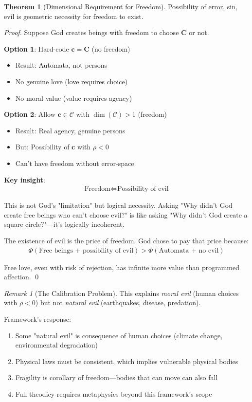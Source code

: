 \documentclass[11pt,a4paper]{article}
\theoremstyle{definition}
\newtheorem{theorem}{Theorem}[section]
\theoremstyle{remark}
\newtheorem{remark}{Remark}[section]
\newcommand{\CC}{\mathcal{C}}
\newcommand{\cc}{\mathbf{c}}
\begin{document}
\begin{enumerate}
\begin{theorem}[Dimensional Requirement for Freedom]
Possibility of error, sin, evil is geometric necessity for freedom to exist.
\end{theorem}

\begin{proof}
Suppose God creates beings with freedom to choose \(\mathbf{C}\) or not.

\textbf{Option 1}: Hard-code \(\cc = \mathbf{C}\) (no freedom)
\begin{itemize}
    \item Result: Automata, not persons
    \item No genuine love (love requires choice)
    \item No moral value (value requires agency)
\end{itemize}

\textbf{Option 2}: Allow \(\cc \in \CC\) with \(\dim(\CC) > 1\) (freedom)
\begin{itemize}
    \item Result: Real agency, genuine persons
    \item But: Possibility of \(\cc\) with \(\rho < 0\)
    \item Can't have freedom without error-space
\end{itemize}

\textbf{Key insight}: 
\begin{align}
\text{Freedom} \iff \text{Possibility of evil}
\end{align}

This is not God's "limitation" but logical necessity. Asking "Why didn't God create free beings who can't choose evil?" is like asking "Why didn't God create a square circle?"—it's logically incoherent.

The existence of evil is the price of freedom. God chose to pay that price because:
\begin{align}
\Phi(\text{Free beings + possibility of evil}) > \Phi(\text{Automata + no evil})
\end{align}

Free love, even with risk of rejection, has infinite more value than programmed affection. \qed
\end{proof}

\begin{remark}[The Calibration Problem]
This explains \textit{moral evil} (human choices with \(\rho < 0\)) but not \textit{natural evil} (earthquakes, disease, predation).

Framework's response:
\begin{enumerate}
    \item Some "natural evil" is consequence of human choices (climate change, environmental degradation)
    \item Physical laws must be consistent, which implies vulnerable physical bodies
    \item Fragility is corollary of freedom—bodies that can move can also fall
    \item Full theodicy requires metaphysics beyond this framework's scope
\end{enumerate}


\end{remark}
\end{enumerate}
\end{document}
